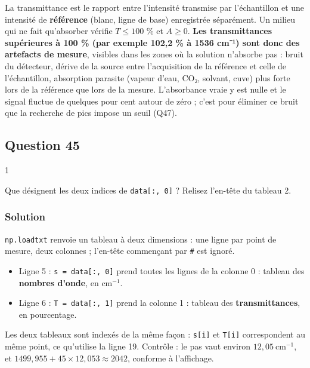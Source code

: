\documentclass[11pt,a4paper]{article}
\providecommand{\tightlist}{\setlength{\itemsep}{0pt}\setlength{\parskip}{0pt}}
\begin{document}
La transmittance est le rapport entre l'intensité transmise par l'échantillon et une intensité de \textbf{référence} (blanc, ligne de base) enregistrée séparément. Un milieu qui ne fait qu'absorber vérifie \(T \le 100\) \% et \(A \ge 0\). \textbf{Les transmittances supérieures à 100 \% (par exemple 102,2 \% à 1536 cm⁻¹) sont donc des artefacts de mesure}, visibles dans les zones où la solution n'absorbe pas : bruit du détecteur, dérive de la source entre l'acquisition de la référence et celle de l'échantillon, absorption parasite (vapeur d'eau, CO₂, solvant, cuve) plus forte lors de la référence que lors de la mesure. L'absorbance vraie y est nulle et le signal fluctue de quelques pour cent autour de zéro ; c'est pour éliminer ce bruit que la recherche de pics impose un seuil (Q47).

\hypertarget{question-45}{%
\subsection{Question 45}\label{question-45}}

\begin{indication}{1}

Que désignent les deux indices de \texttt{data{[}:,\ 0{]}} ? Relisez l'en-tête du tableau 2.

\end{indication}

\hypertarget{solution-44}{%
\subsubsection{Solution}\label{solution-44}}

\texttt{np.loadtxt} renvoie un tableau à deux dimensions : une ligne par point de mesure, deux colonnes ; l'en-tête commençant par \texttt{\#} est ignoré.

\begin{itemize}
\tightlist
\item
  Ligne 5 : \texttt{s\ =\ data{[}:,\ 0{]}} prend toutes les lignes de la colonne 0 : tableau des \textbf{nombres d'onde}, en \(\mathrm{cm^{-1}}\).
\item
  Ligne 6 : \texttt{T\ =\ data{[}:,\ 1{]}} prend la colonne 1 : tableau des \textbf{transmittances}, en pourcentage.
\end{itemize}

Les deux tableaux sont indexés de la même façon : \texttt{s{[}i{]}} et \texttt{T{[}i{]}} correspondent au même point, ce qu'utilise la ligne 19. Contrôle : le pas vaut environ \(12{,}05\ \mathrm{cm^{-1}}\), et \(1499{,}955 + 45\times12{,}053 \approx 2042\), conforme à l'affichage.
\end{document}
